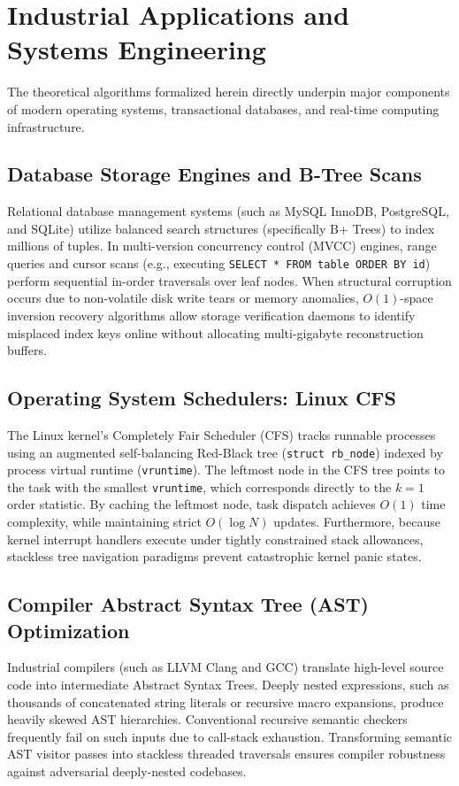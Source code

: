 \documentclass[10pt,twocolumn,letterpaper]{article}
\begin{document}
\section{Industrial Applications and Systems Engineering}
\label{sec:systems}

The theoretical algorithms formalized herein directly underpin major components of modern operating systems, transactional databases, and real-time computing infrastructure.

\subsection{Database Storage Engines and B-Tree Scans}
Relational database management systems (such as MySQL InnoDB, PostgreSQL, and SQLite) utilize balanced search structures (specifically B+ Trees) to index millions of tuples. In multi-version concurrency control (MVCC) engines, range queries and cursor scans (e.g., executing \texttt{SELECT * FROM table ORDER BY id}) perform sequential in-order traversals over leaf nodes. When structural corruption occurs due to non-volatile disk write tears or memory anomalies, $O(1)$-space inversion recovery algorithms allow storage verification daemons to identify misplaced index keys online without allocating multi-gigabyte reconstruction buffers.

\subsection{Operating System Schedulers: Linux CFS}
The Linux kernel's Completely Fair Scheduler (CFS) tracks runnable processes using an augmented self-balancing Red-Black tree (\texttt{struct rb\_node}) indexed by process virtual runtime (\texttt{vruntime}). The leftmost node in the CFS tree points to the task with the smallest \texttt{vruntime}, which corresponds directly to the $k=1$ order statistic. By caching the leftmost node, task dispatch achieves $O(1)$ time complexity, while maintaining strict $O(\log N)$ updates. Furthermore, because kernel interrupt handlers execute under tightly constrained stack allowances, stackless tree navigation paradigms prevent catastrophic kernel panic states.

\subsection{Compiler Abstract Syntax Tree (AST) Optimization}
Industrial compilers (such as LLVM Clang and GCC) translate high-level source code into intermediate Abstract Syntax Trees. Deeply nested expressions, such as thousands of concatenated string literals or recursive macro expansions, produce heavily skewed AST hierarchies. Conventional recursive semantic checkers frequently fail on such inputs due to call-stack exhaustion. Transforming semantic AST visitor passes into stackless threaded traversals ensures compiler robustness against adversarial deeply-nested codebases.
\end{document}
